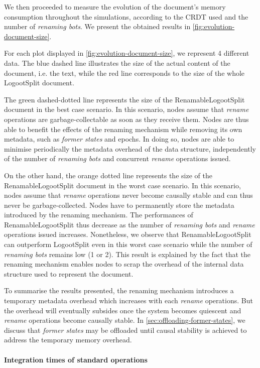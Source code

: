\documentclass[sigplan,10pt]{acmart}
\newcommand{\ie}{i.e. }
\begin{document}
We then proceeded to measure the evolution of the document's memory consumption throughout the simulations, according to the CRDT used and the number of \emph{renaming bots}.
We present the obtained results in \autoref{fig:evolution-document-size}.

For each plot displayed in \autoref{fig:evolution-document-size}, we represent 4 different data.
The blue dashed line illustrates the size of the actual content of the document, \ie the text, while the red line corresponds to the size of the whole LogootSplit document.

The green dashed-dotted line represents the size of the RenamableLogootSplit document in the best case scenario.
In this scenario, nodes assume that \emph{rename} operations are garbage-collectable as soon as they receive them.
Nodes are thus able to benefit the effects of the renaming mechanism while removing its own metadata, such as \emph{former states} and epochs.
In doing so, nodes are able to minimise periodically the metadata overhead of the data structure, independently of the number of \emph{renaming bots} and concurrent \emph{rename} operations issued.

On the other hand, the orange dotted line represents the size of the RenamableLogootSplit document in the worst case scenario.
In this scenario, nodes assume that \emph{rename} operations never become causally stable and can thus never be garbage-collected.
Nodes have to permanently store the metadata introduced by the renaming mechanism.
The performances of RenamableLogootSplit thus decrease as the number of \emph{renaming bots} and \emph{rename} operations issued increases.
Nonetheless, we observe that RenamableLogootSplit can outperform LogootSplit even in this worst case scenario while the number of \emph{renaming bots} remains low (1 or 2).
This result is explained by the fact that the renaming mechanism enables nodes to scrap the overhead of the internal data structure used to represent the document.

To summarise the results presented, the renaming mechanism introduces a temporary metadata overhead which increases with each \emph{rename} operations.
But the overhead will eventually subsides once the system becomes quiescent and \emph{rename} operations become causally stable.
In \autoref{sec:offloading-former-states}, we discuss that \emph{former states} may be offloaded until causal stability is achieved to address the temporary memory overhead.

\paragraph{Integration times of standard operations}
\end{document}
